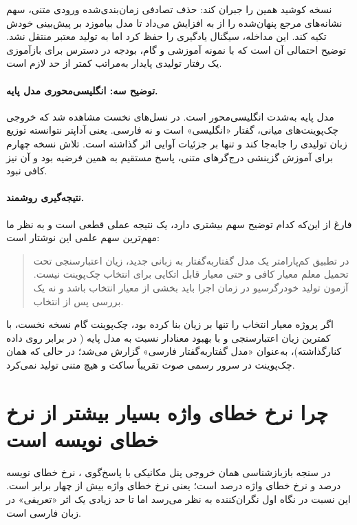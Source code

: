 نسخه  کوشید همین را جبران کند: حذف تصادفی زمان‌بندی‌شده ورودی
متنی، سهم نشانه‌های مرجع پنهان‌شده را از  به  افزایش می‌داد
تا مدل بیاموزد بر پیش‌بینی خودش تکیه کند. این مداخله، سیگنال یادگیری را
حفظ کرد اما به تولید معتبر منتقل نشد. توضیح احتمالی آن است که با
 نمونه آموزشی و  گام، بودجه در دسترس برای بازآموزی یک رفتار
تولیدی پایدار به‌مراتب کمتر از حد لازم است.

\paragraph{توضیح سه: انگلیسی‌محوری مدل پایه.} مدل پایه به‌شدت
انگلیسی‌محور است. در نسل‌های نخست مشاهده شد که خروجی چک‌پوینت‌های
میانی، گفتار «انگلیسی» است و نه فارسی. یعنی آداپتر نتوانسته توزیع
زبان تولیدی را جابه‌جا کند و تنها بر جزئیات آوایی اثر گذاشته است. تلاش
نسخه چهارم برای آموزش گزینشی درج‌گرهای متنی، پاسخ مستقیم به همین فرضیه بود
و آن نیز کافی نبود.

\paragraph{نتیجه‌گیری روشمند.} فارغ از این‌که کدام توضیح سهم بیشتری دارد،
یک نتیجه عملی قطعی است و به نظر ما مهم‌ترین سهم علمی این نوشتار است:

\begin{quote}
در تطبیق کم‌پارامتر یک مدل گفتار‌به‌گفتار به زبانی جدید، زیان اعتبارسنجی
تحت تحمیل معلم معیار کافی و حتی معیار قابل اتکایی برای انتخاب چک‌پوینت
نیست. آزمون تولید خودرگرسیو در زمان اجرا باید بخشی از معیار انتخاب باشد و
نه یک بررسی پس از انتخاب.
\end{quote}

اگر پروژه معیار انتخاب را تنها بر زیان بنا کرده بود، چک‌پوینت گام
 نسخه نخست، با کمترین زیان اعتبارسنجی و با بهبود معنادار نسبت به
مدل پایه ( در برابر  روی داده کنارگذاشته)، به‌عنوان
«مدل گفتار‌به‌گفتار فارسی» گزارش می‌شد؛ در حالی که همان چک‌پوینت در سرور
رسمی صوت تقریباً ساکت و هیچ متنی تولید نمی‌کرد.

\section{چرا نرخ خطای واژه بسیار بیشتر از نرخ خطای نویسه است}
\label{sec:disc-cer-wer}

در سنجه بازبازشناسی همان  خروجی پنل مکانیکی با پاسخ‌گوی
، نرخ خطای نویسه  درصد و نرخ خطای واژه
 درصد است؛ یعنی نرخ خطای واژه بیش از چهار برابر است. این نسبت در
نگاه اول نگران‌کننده به نظر می‌رسد اما تا حد زیادی یک اثر
«تعریفی» در زبان فارسی است.

